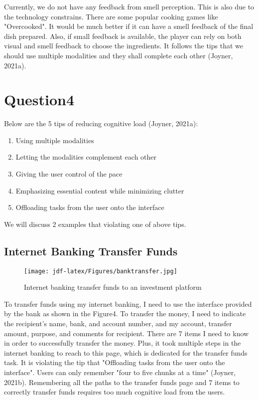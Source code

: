 \documentclass[
	letterpaper, %
]{jdf}
\begin{document}
Currently, we do not have any feedback from smell perception. This is also due to the technology constrains. There are some popular cooking games like "Overcooked". It would be much better if it can have a smell feedback of the final dish prepared. Also, if small feedback is available, the player can rely on both visual and smell feedback to choose the ingredients. It follows the tips that we should use multiple modalities and they shall complete each other (Joyner, 2021a).

\section{Question4}
Below are the 5 tips of reducing cognitive load (Joyner, 2021a):
\begin{enumerate}
	\item Using multiple modalities
	\item Letting the modalities complement each other
	\item Giving the user control of the pace
	\item Emphasizing essential content while minimizing clutter
	\item Offloading tasks from the user onto the interface
\end{enumerate}
We will discuss 2 examples that violating one of above tips.

\subsection{Internet Banking Transfer Funds}
\begin{figure}[h]
	\centering
	\texttt{[image: jdf-latex/Figures/banktransfer.jpg]}
	\caption{Internet banking transfer funds to an investment platform}
	\label{fig:banktransfer}
\end{figure}

To transfer funds using my internet banking, I need to use the interface provided by the bank as shown in the Figure4. To transfer the money, I need to indicate the recipient's name, bank, and account number, and my account, transfer amount, purpose, and comments for recipient. There are 7 items I need to know in order to successfully transfer the money. Plus, it took multiple steps in the internet banking to reach to this page, which is dedicated for the transfer funds task. It is violating the tip that "Offloading tasks from the user onto the interface". Users can only remember "four to five chunks at a time" (Joyner, 2021b). Remembering all the paths to the transfer funds page and 7 items to correctly transfer funds requires too much cognitive load from the users. 
\end{document}

